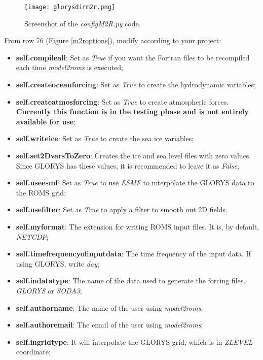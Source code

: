 \begin{figure}[H]
    \centering
    \texttt{[image: glorysdirm2r.png]}
    \caption{Screenshot of the \textit{configM2R.py} code.}
    \label{glorysdirm2r}
\end{figure}
\bigskip

From row 76 (Figure \textcolor{bleu_cite}{\ref{m2roptions}}), modify according to your project: 
\bigskip

\begin{itemize}
    \item \textbf{self.compileall}: Set as \textit{True} if you want the Fortran files to be recompiled each time \textit{model2roms} is executed;
    \item \textbf{self.createoceanforcing}: Set as \textit{True} to create the hydrodynamic variables;
    \item \textbf{self.createatmosforcing}: Set as \textit{True} to create atmospheric forces. \textbf{Currently this function is in the testing phase and is not entirely available for use};
    \item \textbf{self.writeice}: Set as \textit{True} to create the sea ice variables;
    \item \textbf{self.set2DvarsToZero}: Creates the ice and sea level files with zero values. Since GLORYS has these values, it is recommended to leave it as \textit{False};
    \item \textbf{self.useesmf}: Set as \textit{True} to use \textit{ESMF} to interpolate the GLORYS data to the ROMS grid;
    \item \textbf{self.usefilter}: Set as \textit{True} to apply a filter to smooth out 2D fields.
    \item \textbf{self.myformat}: The extension for writing ROMS input files. It is, by default, \textit{NETCDF};
    \item \textbf{self.timefrequencyofinputdata}: The time frequency of the input data. If using GLORYS, write \textit{day};
    \item \textbf{self.indatatype}: The name of the data used to generate the forcing files. \textit{GLORYS} or \textit{SODA3};
    \item \textbf{self.authorname}: The name of the user using \textit{model2roms};
    \item \textbf{self.authoremail}: The email of the user using \textit{model2roms};
    \item \textbf{self.ingridtype}: It will interpolate the GLORYS grid, which is in \textit{ZLEVEL} coordinate;

\end{itemize}
